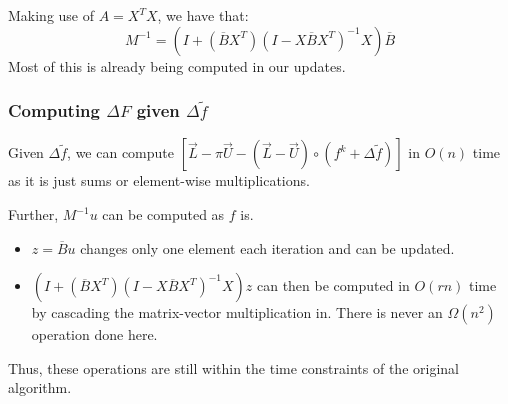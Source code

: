 \documentclass[12pt]{article}
\newcommand{\inv}[1]{#1^{-1}}
\begin{document}
			Making use of $A = X^TX$, we have that:
			\begin{equation}
				\inv{M}=(I+(\overline{B}X^T)\inv{(I-X\overline{B}X^T)}X)\overline{B}
			\end{equation}
			Most of this is already being computed in our updates.

		\subsubsection{Computing $\Delta F$ given $\Delta \widetilde{f}$}
			Given $\Delta \widetilde{f}$, we can compute $\left[\overrightarrow{L} - \pi\overrightarrow{U} - (\overrightarrow{L}-\overrightarrow{U})\circ(f^k + \Delta \widetilde{f})\right]$ in $O(n)$ time as it is just sums or element-wise multiplications.

			Further, $\inv{M}u$ can be computed as $f$ is.
			\begin{itemize}
				\item $z = \overline{B}u$ changes only one element each iteration and can be updated.
				\item $(I+(\overline{B}X^T)\inv{(I-X\overline{B}X^T)}X)z$ can then be computed in $O(rn)$ time by cascading the matrix-vector multiplication in. There is never an $\Omega(n^2)$ operation done here.
			\end{itemize}

			Thus, these operations are still within the time constraints of the original algorithm.
\end{document}
